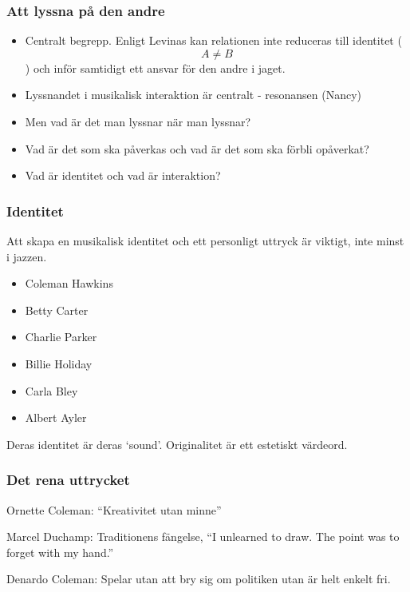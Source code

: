\documentclass[ignorenonframetext]{beamer}
\begin{document}
\begin{frame}
  \frametitle{Att lyssna på den andre}
  \begin{itemize}[<+->]
  \item Centralt begrepp. Enligt Levinas kan relationen inte reduceras till identitet ($$ A \ne B $$) och inför samtidigt ett ansvar för den andre i jaget.
  \item Lyssnandet i musikalisk interaktion är centralt - resonansen (Nancy)
  \item Men vad är det man lyssnar när man lyssnar?
  \item Vad är det som ska påverkas och vad är det som ska förbli opåverkat?
  \item Vad är identitet och vad är interaktion?
  \end{itemize}
\end{frame}

  \begin{frame}
    \frametitle{Identitet}
    Att skapa en musikalisk identitet och ett personligt uttryck är viktigt, inte minst i jazzen.

    \begin{itemize}[<+->]
    \item Coleman Hawkins
    \item Betty Carter
    \item Charlie Parker
    \item Billie Holiday
    \item Carla Bley
    \item Albert Ayler
    \end{itemize}

    Deras identitet är deras `sound'. Originalitet är ett estetiskt värdeord.
  \end{frame}

  \begin{frame}
    \frametitle{Det rena uttrycket}
    
    Ornette Coleman: ``Kreativitet utan minne''

    Marcel Duchamp: Traditionens fängelse, ``I unlearned to draw. The point was to forget with my hand.''

    Denardo Coleman: Spelar utan att bry sig om politiken utan är helt enkelt fri.

  \end{frame}
\end{document}
